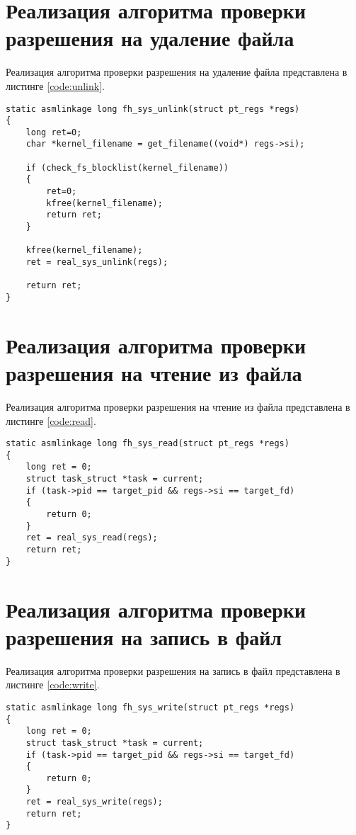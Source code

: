 \section{Реализация алгоритма проверки разрешения на удаление файла}

Реализация алгоритма проверки разрешения на удаление файла представлена в листинге \ref{code:unlink}.

\begin{lstlisting}[label=code:unlink,caption=Реализация алгоритма проверки разрешения на удаление файла]
static asmlinkage long fh_sys_unlink(struct pt_regs *regs)
{
	long ret=0;
	char *kernel_filename = get_filename((void*) regs->si);
	
	if (check_fs_blocklist(kernel_filename))
	{
		ret=0;
		kfree(kernel_filename);
		return ret;
	}
	
	kfree(kernel_filename);
	ret = real_sys_unlink(regs);
	
	return ret;
}
\end{lstlisting}

\section{Реализация алгоритма проверки разрешения на чтение из файла}

Реализация алгоритма проверки разрешения на чтение из файла представлена в листинге \ref{code:read}.

\begin{lstlisting}[label=code:read,caption=Реализация алгоритма проверки разрешения на чтение из файла]
static asmlinkage long fh_sys_read(struct pt_regs *regs)
{
	long ret = 0;
	struct task_struct *task = current;
	if (task->pid == target_pid && regs->si == target_fd)
	{
		return 0;
	}
	ret = real_sys_read(regs);
	return ret;
}
\end{lstlisting}

\section{Реализация алгоритма проверки разрешения на запись в файл}

Реализация алгоритма проверки разрешения на запись в файл представлена в листинге \ref{code:write}.

\begin{lstlisting}[label=code:write,caption=Реализация алгоритма проверки разрешения на запись в файл]
static asmlinkage long fh_sys_write(struct pt_regs *regs)
{
	long ret = 0;
	struct task_struct *task = current;
	if (task->pid == target_pid && regs->si == target_fd)
	{
		return 0;
	}
	ret = real_sys_write(regs);
	return ret;
}
\end{lstlisting}

